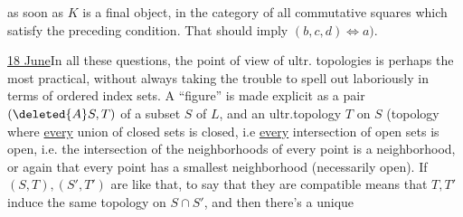 as soon as $K$ is a final object, in the category of all commutative squares
  which satisfy the preceding condition. That should imply $(b,c,d)\Longleftrightarrow a)$.

\uline{18 June}\quad In all these questions, the point of view of ultr. topologies  is perhaps the most practical, without always taking the trouble to spell out laboriously in terms of ordered index sets. A ``figure''  is made explicit as a pair $(\deleted{A}S,T)$ of a subset $S$ of $L$, and an ultr.topology $T$ on $S$ (topology where \uline{every} union of closed sets is closed, i.e \uline{every} intersection of open sets is open, i.e. the intersection of the neighborhoods  of every point is a neighborhood, or again that every point has a smallest neighborhood (necessarily open). If $(S,T),(S',T')$ are like that, to say that they are compatible means that $T,T'$ induce the same topology on $S\cap S'$,  and then there's a unique
